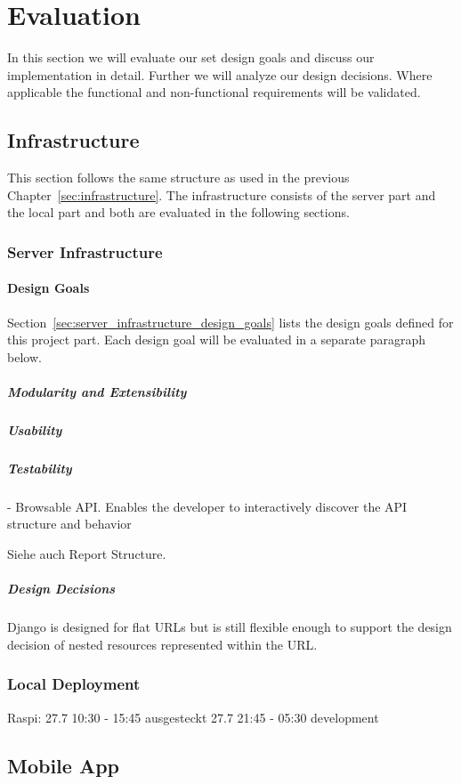 \chapter{Evaluation}
\label{sec:evaluation}

In this section we will evaluate our set design goals and discuss our implementation in detail.
Further we will analyze our design decisions.
Where applicable the functional and non-functional requirements will be validated.

\section{Infrastructure}

This section follows the same structure as used in the previous Chapter~\ref{sec:infrastructure}.
The infrastructure consists of the server part and the local part and both are evaluated in the following sections.

\subsection{Server Infrastructure}

\subsubsection{Design Goals}

Section~\ref{sec:server_infrastructure_design_goals} lists the design goals defined for this project part.
Each design goal will be evaluated in a separate paragraph below.

\paragraph{Modularity and Extensibility}

\paragraph{Usability}

\paragraph{Testability}


- Browsable API. Enables the developer to interactively discover the API structure and behavior

Siehe auch Report Structure.


\paragraph{Design Decisions}

Django is designed for flat URLs but is still flexible enough to support the design decision of nested resources represented within the URL.


\subsection{Local Deployment}

Raspi: 27.7 10:30 - 15:45 ausgesteckt
27.7 21:45 - 05:30 development


\section{Mobile App}
